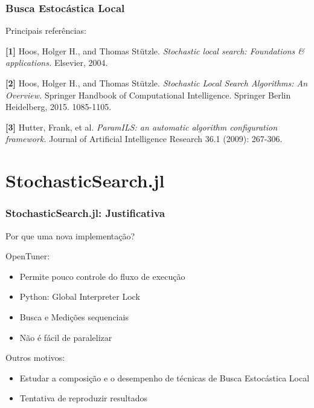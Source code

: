 \documentclass[10pt, compress]{beamer}
\begin{document}
\begin{frame}[fragile]
    \frametitle{Busca Estocástica Local}
    Principais referências:

    \textbf{[1]} Hoos, Holger H., and Thomas Stützle.
    \emph{Stochastic local search: Foundations \& applications.} Elsevier, 2004.
            \pause

    \textbf{[2]} Hoos, Holger H., and Thomas Stützle. \emph{Stochastic Local Search Algorithms: An Overview.}
    Springer Handbook of Computational Intelligence. Springer Berlin Heidelberg, 2015. 1085-1105.
            \pause

    \textbf{[3]} Hutter, Frank, et al. \emph{ParamILS: an automatic
    algorithm configuration framework.} Journal of Artificial
    Intelligence Research 36.1 (2009): 267-306.
\end{frame}

\section{StochasticSearch.jl}

\begin{frame}[fragile]
    \frametitle{StochasticSearch.jl: Justificativa}
    Por que uma nova implementação?

    OpenTuner:
    \begin{itemize}
        \item Permite \alert{pouco controle} do fluxo de execução
            \pause
        \item Python: \alert{Global Interpreter Lock}
            \pause
        \item Busca e Medições \alert{sequenciais}
            \pause
        \item Não é fácil de \alert{paralelizar}
    \end{itemize}
    \pause
    Outros motivos:
    \begin{itemize}
        \item Estudar a \alert{composição} e o \alert{desempenho} de técnicas
            de Busca Estocástica Local
            \pause
        \item Tentativa de \alert{reproduzir} resultados
    \end{itemize}
\end{frame}
\end{document}
